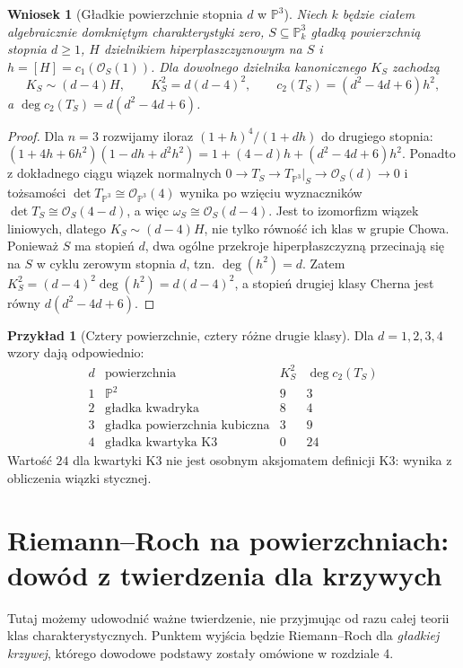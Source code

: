 \documentclass[11pt,a4paper,openany]{report}
\numberwithin{equation}{section}
\theoremstyle{plain}
\newtheorem{wniosek}[twierdzenie]{Wniosek}
\theoremstyle{definition}
\newtheorem{przyklad}[twierdzenie]{Przykład}
\theoremstyle{remark}
\newcommand{\PP}{\mathbb P}
\begin{document}
\begin{wniosek}[Gładkie powierzchnie stopnia $d$ w $\PP^3$]
\label{wn:ga7-degree-d-surface}
Niech $k$ będzie ciałem algebraicznie domkniętym
charakterystyki zero, $S\subseteq\PP^3_k$ gładką
powierzchnią stopnia $d\ge1$, $H$ dzielnikiem
hiperpłaszczyznowym na $S$ i $h=[H]=c_1(\mathcal O_S(1))$.
Dla dowolnego dzielnika kanonicznego $K_S$ zachodzą
\[
 K_S\sim(d-4)H,\qquad K_S^2=d(d-4)^2,\qquad
 c_2(T_S)=(d^2-4d+6)h^2,
\]
a $\deg c_2(T_S)=d(d^2-4d+6)$.
\end{wniosek}
\begin{proof}
Dla $n=3$ rozwijamy iloraz
$(1+h)^4/(1+dh)$ do drugiego stopnia:
$(1+4h+6h^2)(1-dh+d^2h^2)
=1+(4-d)h+(d^2-4d+6)h^2$.
Ponadto z dokładnego ciągu wiązek normalnych
$0\to T_S\to T_{\PP^3}|_S\to\mathcal O_S(d)\to0$
i tożsamości $\det T_{\PP^3}\cong\mathcal O_{\PP^3}(4)$
wynika po wzięciu wyznaczników
$\det T_S\cong\mathcal O_S(4-d)$, a więc
$\omega_S\cong\mathcal O_S(d-4)$.
Jest to izomorfizm wiązek liniowych, dlatego
$K_S\sim(d-4)H$, nie tylko równość ich klas w grupie Chowa.
Ponieważ $S$ ma stopień $d$, dwa ogólne przekroje
hiperpłaszczyzną przecinają się na $S$ w cyklu zerowym
stopnia $d$, tzn. $\deg(h^2)=d$.
Zatem $K_S^2=(d-4)^2\deg(h^2)=d(d-4)^2$,
a stopień drugiej klasy Cherna jest równy
$d(d^2-4d+6)$.
\end{proof}

\begin{przyklad}[Cztery powierzchnie, cztery różne drugie klasy]
\label{prz:ga7-surface-invariants}
Dla $d=1,2,3,4$ wzory dają odpowiednio:
\[
\begin{array}{c|c|c|c}
 d & \text{powierzchnia} & K_S^2 & \deg c_2(T_S)\\ \hline
 1 & \PP^2 & 9 & 3\\
 2 & \text{gładka kwadryka} & 8 & 4\\
 3 & \text{gładka powierzchnia kubiczna} & 3 & 9\\
 4 & \text{gładka kwartyka K3} & 0 & 24
\end{array}
\]
Wartość $24$ dla kwartyki K3 nie jest osobnym aksjomatem
definicji K3: wynika z obliczenia wiązki stycznej.
\end{przyklad}

\section{Riemann--Roch na powierzchniach: dowód z twierdzenia dla krzywych}
\label{sec:ga7-rr-surface}

Tutaj możemy udowodnić ważne twierdzenie, nie przyjmując
od razu całej teorii klas charakterystycznych. Punktem wyjścia
będzie Riemann--Roch dla \emph{gładkiej krzywej}, którego
dowodowe podstawy zostały omówione w rozdziale 4.
\end{document}
